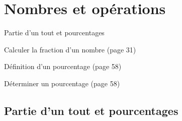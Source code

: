 \documentclass[a4paper,11pt]{report}
\begin{document}
\newcommand{\chapterName}{Nombres et opérations}
\newcommand{\serieName}{Partie d'un tout et pourcentages}


\chapter*{\chapterName}
\thispagestyle{empty}

\begin{amL}{\serieName}{
	\item Calculer la fraction d'un nombre (page 31)
	\item Définition d'un pourcentage (page 58)
	\item Déterminer un pourcentage (page 58)
}
\end{amL}

\section*{\serieName}
\setcounter{page}{1}
\thispagestyle{firstPage}



\end{document}
